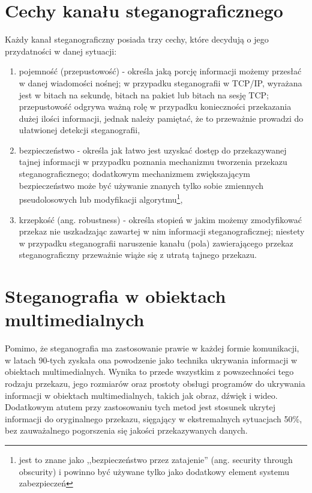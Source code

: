 \documentclass[a4paper,12pt,twoside,openany]{report}
\begin{document}
\section{Cechy kanału steganograficznego}
Każdy kanał steganograficzny posiada trzy cechy, które decydują o jego przydatności w danej sytuacji:
\begin{enumerate}
	\item pojemność (przepustowość) - określa jaką porcję informacji możemy przesłać w danej wiadomości nośnej; w przypadku steganografii w TCP/IP, wyrażana jest w bitach na sekundę, bitach na pakiet lub bitach na sesję TCP; przepustowość odgrywa ważną rolę w przypadku konieczności przekazania dużej ilości informacji, jednak należy pamiętać, że to przeważnie prowadzi do ułatwionej detekcji steganografii,
	\item bezpieczeństwo - określa jak łatwo jest uzyskać dostęp do przekazywanej tajnej informacji w przypadku poznania mechanizmu tworzenia przekazu steganograficznego; dodatkowym mechanizmem zwiększającym bezpieczeństwo może być używanie znanych tylko sobie zmiennych pseudolosowych lub modyfikacji algorytmu\footnote{jest to znane jako ,,bezpieczeństwo przez zatajenie'' (ang. security through obscurity) i powinno być używane tylko jako dodatkowy element systemu zabezpieczeń},
	\item krzepkość (ang. robustness) - określa stopień w jakim możemy zmodyfikować przekaz nie uszkadzając zawartej w nim informacji steganograficznej; niestety w przypadku steganografii naruszenie kanału (pola) zawierającego przekaz steganograficzny przeważnie wiąże się z utratą tajnego przekazu.
\end{enumerate}

\section{Steganografia w obiektach multimedialnych}
\label{sectionSteganografiaWObiektachMultimedialnych}
Pomimo, że steganografia ma zastosowanie prawie w każdej formie komunikacji, w latach 90-tych zyskała ona powodzenie jako technika ukrywania informacji w obiektach multimedialnych. Wynika to przede wszystkim z powszechności tego rodzaju przekazu, jego rozmiarów oraz prostoty obsługi programów do ukrywania informacji w obiektach multimedialnych, takich jak obraz, dźwięk i wideo. Dodatkowym atutem przy zastosowaniu tych metod jest stosunek ukrytej informacji do oryginalnego przekazu, sięgający w ekstremalnych sytuacjach 50\%, bez zauważalnego pogorszenia się jakości przekazywanych danych.
\end{document}
